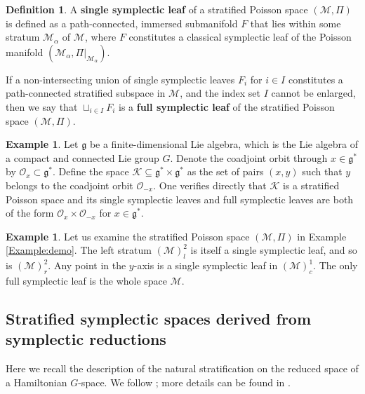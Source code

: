 \documentclass[12pt]{amsart}
\theoremstyle{definition}
\newtheorem{definition}[theorem]{Definition}
\newtheorem{example}[theorem]{Example}
\numberwithin{equation}{section}
\newcommand{\gstar}{\mathfrak{g}^*}
\newcommand{\galgebra}{\mathfrak{g}}
\newcommand{\middleK}{\mathcal{K}}
\begin{document}
	
	\begin{definition} 
		A \textbf{single symplectic leaf} of a stratified Poisson space $(\mathcal{M},\Pi)$ is defined as a path-connected, immersed submanifold $F $ that lies within some stratum $\mathcal{M}_{\alpha}$ of $\mathcal{M}$, where $F $ constitutes a classical symplectic leaf of the Poisson manifold $(\mathcal{M}_{\alpha},\Pi|_{\mathcal{M}_{\alpha}} )$.
		
If a non-intersecting union of single symplectic leaves ${F_i}$ for ${i\in I}$ constitutes a path-connected stratified subspace in $\mathcal{M}$, and the index set $I$  cannot be enlarged, then we say that $\sqcup_{i\in I} F_i$ is a \textbf{full symplectic leaf} of the stratified Poisson space $(\mathcal{M},\Pi)$.

	\end{definition}
	
	\begin{example}\label{Example:K}    Let $\galgebra$ be a finite-dimensional Lie algebra, which is  the Lie algebra of a compact and connected  Lie group $G$. 
Denote the coadjoint orbit through $x\in \galgebra^*$ by $\mathcal{O}_x\subset \galgebra^*$. Define the space $\middleK \subseteq \gstar \times \gstar$ as the set of pairs $(x, y)$ such that $y$ belongs to the coadjoint orbit $\mathcal{O}_{-x}$. One verifies directly that  $\middleK$ is a stratified Poisson space and its single  symplectic leaves  and full symplectic leaves are both of the form $\mathcal{O}_{x} \times \mathcal{O}_{-x}$ for $x \in \gstar$. 		
		 \end{example}

\begin{example}Let us examine the stratified Poisson space $(\mathcal{M} , \Pi)$ in Example \ref{Example:demo}. The left stratum $(\mathcal{M})^2_l $ is itself a single symplectic leaf, and so is $(\mathcal{M})^2_r $. Any point in the $y$-axis is a single symplectic leaf in $ (\mathcal{M})^1_c  $. The only full symplectic leaf is the whole space $\mathcal{M} $. 
\end{example}
 	 
	\subsection{Stratified symplectic spaces derived from symplectic reductions}\label{Sec:SLmethod}
	Here we recall the description of the natural stratification on the reduced space of a Hamiltonian $G$-space. We follow  \cite{SLannals}; more details can be found in \cite{BatesLerman1997,Pflaumpaper}.
	
\end{document}
